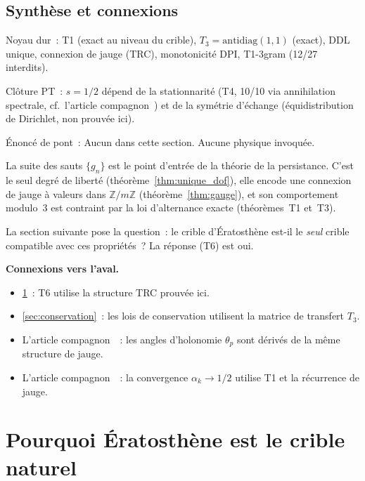 \documentclass[12pt,a4paper]{article}
\begin{document}
\subsection{Synthèse et connexions}
\label{sec:ch1_summary}

\begin{ledgerbox}
Noyau dur~:
  T1 (exact au niveau du crible), $T_3 = \mathrm{antidiag}(1,1)$
  (exact), DDL unique, connexion de jauge (TRC), monotonicité DPI,
  T1-3gram (12/27 interdits).

Clôture PT~:
  $s = 1/2$ dépend de la stationnarité (T4, 10/10 via annihilation
  spectrale, cf.\ l'article compagnon~\cite{companion_M3}) et de la
  symétrie d'échange (équidistribution de Dirichlet, non prouvée ici).

Énoncé de pont~:
  Aucun dans cette section. Aucune physique invoquée.
\end{ledgerbox}

\medskip

La suite des sauts $\{g_n\}$ est le point d'entrée de la théorie de la
persistance. C'est le seul degré de liberté
(théorème~\ref{thm:unique_dof}), elle encode une connexion de jauge à
valeurs dans $\mathbb{Z}/m\mathbb{Z}$ (théorème~\ref{thm:gauge}), et
son comportement modulo~3 est contraint par la loi d'alternance
exacte (théorèmes~T1 et~T3).

La section suivante pose la question~: le crible d'Ératosthène est-il
le \emph{seul} crible compatible avec ces propriétés~? La réponse
(T6) est oui.

\medskip\noindent\textbf{Connexions vers l'aval.}
\begin{itemize}
\item \cref{sec:uniqueness}~: T6 utilise la structure TRC prouvée ici.
\item \cref{sec:conservation}~: les lois de conservation utilisent la
  matrice de transfert $T_3$.
\item L'article compagnon~\cite{companion_M2}~: les angles d'holonomie
  $\theta_p$ sont dérivés de la même structure de jauge.
\item L'article compagnon~\cite{companion_M3}~: la convergence
  $\alpha_k \to 1/2$ utilise T1 et la récurrence de jauge.
\end{itemize}

\section{Pourquoi Ératosthène est le crible naturel}
\label{sec:uniqueness}
\end{document}
